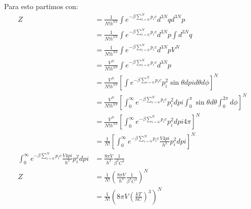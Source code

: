 \documentclass{report}
\begin{document}
\chapter{}

\section{}

Para esto partimos con:
\begin{align*}
	Z &= \frac{1}{N! h^{3N}} \int e^{-\beta \sum_{i = 0}^{N} p_i c} d^{3N}q d^{3N}p\\
	&= \frac{1}{N! h^{3N}} \int e^{-\beta \sum_{i = 0}^{N} p_i c} d^{3N}p \int d^{3N}q\\
	&= \frac{1}{N! h^{3N}} \int e^{-\beta \sum_{i = 0}^{N} p_i c} d^{3N}p V^N\\
	&= \frac{V^N}{N! h^{3N}} \int e^{-\beta \sum_{i = 0}^{N} p_i c} d^{3N}p\\
	&= \frac{V^N}{N! h^{3N}} \left[\int e^{-\beta \sum_{i = 0}^{N} p_i c} p_i^2 \sin\theta dpi d\theta d\phi\right]^N\\
	&= \frac{V^N}{N! h^{3N}} \left[\int_0^\infty e^{-\beta \sum_{i = 0}^{N} p_i c} p_i^2 dpi \int_0^\pi \sin\theta d\theta \int_0^{2\pi} d\phi\right]^N\\
	&= \frac{V^N}{N! h^{3N}} \left[\int_0^\infty e^{-\beta \sum_{i = 0}^{N} p_i c} p_i^2 dpi 4\pi\right]^N\\
	&= \frac{1}{N!} \left[\int_0^\infty e^{-\beta \sum_{i = 0}^{N} p_i c} \frac{V 4pi}{h^3}p_i^2 dpi\right]^N\\
	\int_0^\infty e^{-\beta \sum_{i = 0}^{N} p_i c} \frac{V 4pi}{h^3}p_i^2 dpi &= \frac{8\pi V}{h^3} \frac{1}{\beta^3 C^3}\\
	Z &= \frac{1}{N!}\left( \frac{8\pi V}{h^3} \frac{1}{\beta^3 C^3} \right)^N\\
	&= \frac{1}{N!} \left( 8\pi V \left( \frac{kT}{hC} \right)^3\right)^N
\end{align*}

\section{}
\end{document}
